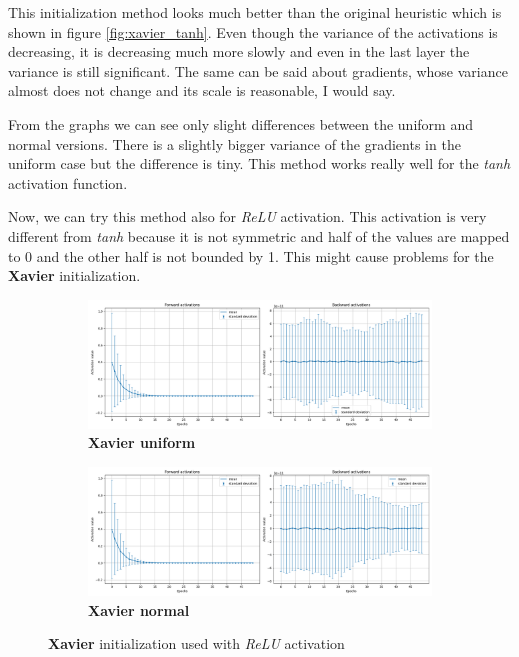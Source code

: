 \documentclass[a4paper,11pt]{article}
\begin{document}
This initialization method looks much better than the original heuristic which is shown in figure \ref{fig:xavier_tanh}.
Even though the variance of the activations is decreasing, it is decreasing much more slowly and even in the last layer the variance is still significant.
The same can be said about gradients, whose variance almost does not change and its scale is reasonable, I would say.

From the graphs we can see only slight differences between the uniform and normal versions.
There is a slightly bigger variance of the gradients in the uniform case but the difference is tiny.
This method works really well for the \textit{tanh} activation function.

Now, we can try this method also for \textit{ReLU} activation.
This activation is very different from \textit{tanh} because it is not symmetric and half of the values are mapped to 0 and the other half is not bounded by 1.
This might cause problems for the \textbf{Xavier} initialization.

\begin{figure}[ht]
    \centering
    \begin{subfigure}[b]{0.95\textwidth}
        \includegraphics[width=\textwidth]{../out/01_deep/relu_xavier_uniform.png}
        \caption{\textbf{Xavier uniform}}
    \end{subfigure}
    \begin{subfigure}[b]{0.95\textwidth}
        \includegraphics[width=\textwidth]{../out/01_deep/relu_xavier_normal.png}
        \caption{\textbf{Xavier normal}}
    \end{subfigure}
    \caption{\textbf{Xavier} initialization used with \textit{ReLU} activation}
    \label{fig:xavier_relu}
\end{figure}
\end{document}
